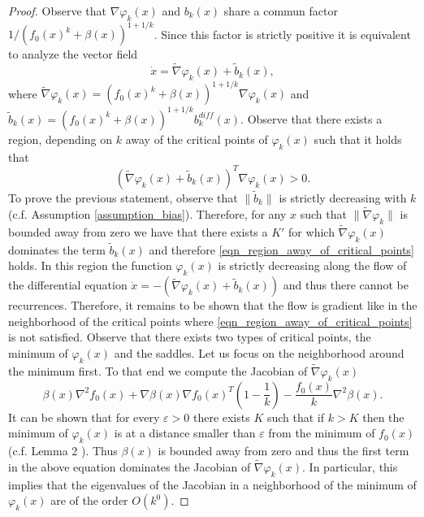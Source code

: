 \documentclass[article]{IEEEtran}
\theoremstyle{definition}
\begin{document}
\begin{proof}
Observe that $\nabla \varphi_k(x)$ and $b_k(x)$ share a commun factor $1/(f_0(x)^k+\beta(x))^{1+1/k}$. Since this factor is strictly positive it is equivalent to analyze the vector field
%
\begin{equation}
\dot{x} = \tilde{\nabla}\varphi_k(x) + \tilde{b}_k(x),
\end{equation}
%
where $\tilde{\nabla}\varphi_k(x) =(f_0(x)^k+\beta(x))^{1+1/k}\nabla \varphi_k(x)$ and $\tilde{b}_k(x) = (f_0(x)^k+\beta(x))^{1+1/k} b^{diff}_k(x)$. Observe that there exists a region, depending on $k$ away of the critical points of $ \varphi_k(x) $ such that it holds that 
%
\begin{equation}\label{eqn_region_away_of_critical_points}
\left(\tilde{\nabla} \varphi_k(x) + \tilde{b}_k(x) \right)^T \nabla\varphi_k(x) >0.
\end{equation}
%
To prove the previous statement, observe that $\|\tilde{b}_k\|$ is strictly decreasing with $k$ (c.f. Assumption \ref{assumption_bias}). Therefore, for any $x$ such that $\|\tilde{\nabla}\varphi_k\|$ is bounded away from zero we have that there exists a $K'$ for which $\tilde{\nabla} \varphi_k(x)$ dominates the term $\tilde{b}_k(x)$ and therefore \eqref{eqn_region_away_of_critical_points} holds. In this region the function $\varphi_k(x)$ is strictly decreasing along the flow of the differential equation $\dot{x} =-\left(\tilde{\nabla} \varphi_k(x)+\tilde{b}_k(x)\right)$ and thus there cannot be recurrences. Therefore, it remains to be shown that the flow is gradient like in the neighborhood of the critical points where \eqref{eqn_region_away_of_critical_points} is not satisfied. Observe that there exists two types of critical points, the minimum of $\varphi_k(x)$ and the saddles. Let us focus on the neighborhood around the minimum first. To that end we compute the Jacobian of $\tilde{\nabla}\varphi_k(x)$ 
%
\begin{equation}
\beta(x)\nabla^2f_0(x) + \nabla \beta(x)\nabla f_0(x)^T\left(1-\frac{1}{k}\right)-\frac{f_0(x)}{k}\nabla^2 \beta(x).
\end{equation}
%
It can be shown that for every $\varepsilon>0$ there exists $K$ such that if $k>K$ then the minimum of $\varphi_k(x)$ is at a distance smaller than $\varepsilon$ from the minimum of $f_0(x)$ (c.f. Lemma 2 \cite{PaternainEtal15}). Thus $\beta(x)$ is bounded away from zero and thus the first term in the above equation dominates the Jacobian of $\tilde{\nabla}\varphi_k(x)$. In particular, this implies that the eigenvalues of the Jacobian in a neighborhood of the minimum of $\varphi_k(x)$ are of the order $O(k^0)$.

\end{proof}
\end{document}
